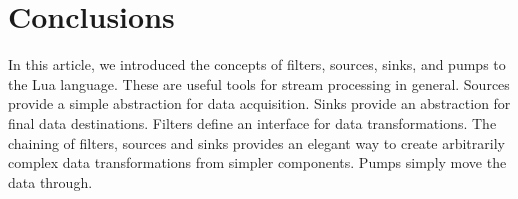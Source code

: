 \documentclass[10pt]{article}
\begin{document}
\section{Conclusions}

In this article, we introduced the concepts of filters,
sources, sinks, and pumps to the Lua language. These are
useful tools for stream processing in general. Sources provide
a simple abstraction for data acquisition. Sinks provide an
abstraction for final data destinations. Filters define an
interface for data transformations.  The chaining of
filters, sources and sinks provides an elegant way to create
arbitrarily complex data transformations from simpler
components. Pumps simply move the data through.  
\end{document}
